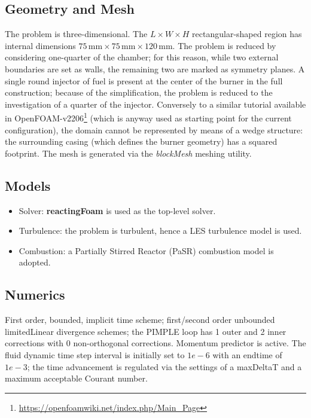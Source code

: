 \subsection*{Geometry and Mesh}
The problem is three-dimensional. The $L \times W \times H$ rectangular-shaped region has internal dimensions $75 \, \text{mm} \times 75 \, \text{mm} \times 120 \, \text{mm}$. The problem is reduced by considering one-quarter of the chamber; for this reason, while two external boundaries are set as walls, the remaining two are marked as symmetry planes. A single round injector of fuel is present at the center of the burner in the full construction; because of the simplification, the problem is reduced to the investigation of a quarter of the injector. Conversely to a similar tutorial available in OpenFOAM-v2206\footnote{\url{https://openfoamwiki.net/index.php/Main_Page}} (which is anyway used as starting point for the current configuration), the domain cannot be represented by means of a wedge structure: the surrounding casing (which defines the burner geometry) has a squared footprint. The mesh is generated via the \textit{blockMesh} meshing utility.

\subsection*{Models}
\begin{itemize}
    \item Solver: \textbf{reactingFoam} is used as the top-level solver.
    \item Turbulence: the problem is turbulent, hence a LES turbulence model is used.
    \item Combustion: a Partially Stirred Reactor (PaSR) combustion model is adopted.
\end{itemize}

\subsection*{Numerics}
First order, bounded, implicit time scheme; first/second order unbounded limitedLinear divergence schemes; the PIMPLE loop has 1 outer and 2 inner corrections with 0 non-orthogonal corrections. Momentum predictor is active. The fluid dynamic time step interval is initially set to $1e-6$ with an endtime of $1e-3$; the time advancement is regulated via the settings of a maxDeltaT and a maximum acceptable Courant number.

